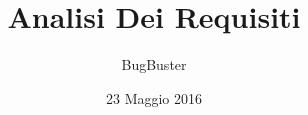 



\title{\textbf{Analisi Dei Requisiti}}
\author{BugBuster}

\date{23 Maggio 2016}




\makeFrontPage

\tableofcontents





